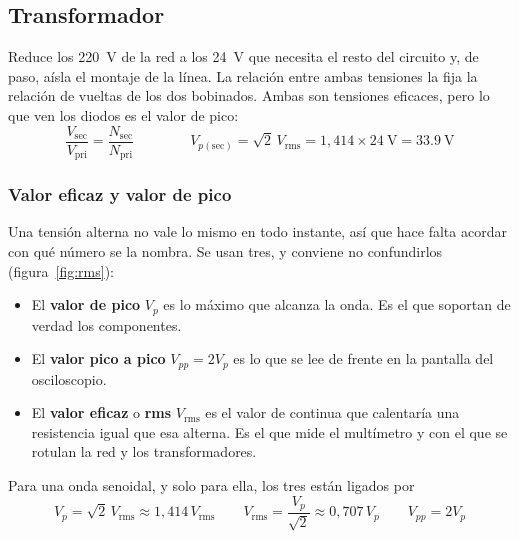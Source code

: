 \documentclass[11pt,a4paper]{article}
\begin{document}
\subsection{Transformador}
Reduce los \qty{220}{\volt} de la red a los \qty{24}{\volt} que necesita el resto del
circuito y, de paso, aísla el montaje de la línea. La relación entre ambas tensiones la
fija la relación de vueltas de los dos bobinados. Ambas son tensiones eficaces, pero lo
que ven los diodos es el valor de pico:
\begin{equation}
  \frac{V_{\text{sec}}}{V_{\text{pri}}}=\frac{N_{\text{sec}}}{N_{\text{pri}}}
  \qquad\qquad
  V_{p(\text{sec})}=\sqrt{2}\,V_{\text{rms}}=1{,}414\times\qty{24}{\volt}=\qty{33.9}{\volt}
\end{equation}

\subsubsection{Valor eficaz y valor de pico}
Una tensión alterna no vale lo mismo en todo instante, así que hace falta acordar con qué
número se la nombra. Se usan tres, y conviene no confundirlos
(figura~\ref{fig:rms}):

\begin{itemize}
  \item El \textbf{valor de pico} $V_p$ es lo máximo que alcanza la onda. Es el que
        soportan de verdad los componentes.
  \item El \textbf{valor pico a pico} $V_{pp}=2V_p$ es lo que se lee de frente en la
        pantalla del osciloscopio.
  \item El \textbf{valor eficaz} o \textbf{rms} $V_{\text{rms}}$ es el valor de continua
        que calentaría una resistencia igual que esa alterna. Es el que mide el multímetro
        y con el que se rotulan la red y los transformadores.
\end{itemize}

Para una onda senoidal, y solo para ella, los tres están ligados por
\begin{equation}
  V_p=\sqrt{2}\,V_{\text{rms}}\approx 1{,}414\,V_{\text{rms}}
  \qquad
  V_{\text{rms}}=\frac{V_p}{\sqrt{2}}\approx 0{,}707\,V_p
  \qquad
  V_{pp}=2V_p
  \label{eq:rms}
\end{equation}
\end{document}

